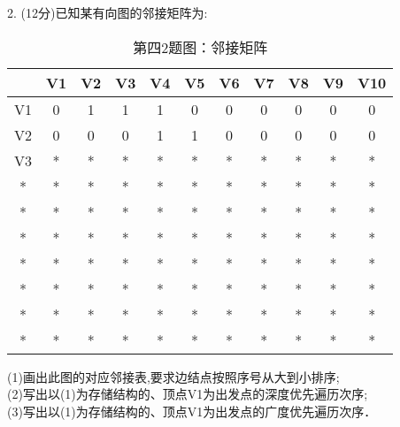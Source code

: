 2. (12分)已知某有向图的邻接矩阵为:
\begin{table}[ht]
\centering
\caption{第四2题图：邻接矩阵}\label{ZSDS13_tab1}
\begin{tabular}{|c|c|c|c|c|c|c|c|c|c|c|}
\hline
 & V1 & V2 & V3 & V4 & V5 & V6 & V7 & V8 & V9 & V10 \\
\hline
V1 & 0 & 1 & 1 & 1 & 0 & 0 & 0 & 0 & 0 & 0 \\
\hline
V2 & 0 & 0 & 0 & 1 & 1 & 0 & 0 & 0 & 0 & 0 \\
\hline
V3 & * & * & * & * & * & * & * & * & * & * \\
\hline
* & * & * & * & * & * & * & * & * & * & * \\
\hline
* & * & * & * & * & * & * & * & * & * & * \\
\hline
* & * & * & * & * & * & * & * & * & * & * \\
\hline
* & * & * & * & * & * & * & * & * & * & * \\
\hline
* & * & * & * & * & * & * & * & * & * & * \\
\hline
* & * & * & * & * & * & * & * & * & * & * \\
\hline
* & * & * & * & * & * & * & * & * & * & * \\
\hline
\end{tabular}
\end{table}
(1)画出此图的对应邻接表,要求边结点按照序号从大到小排序; \\
(2)写出以(1)为存储结构的、顶点V1为出发点的深度优先遍历次序; \\
(3)写出以(1)为存储结构的、顶点V1为出发点的广度优先遍历次序．

